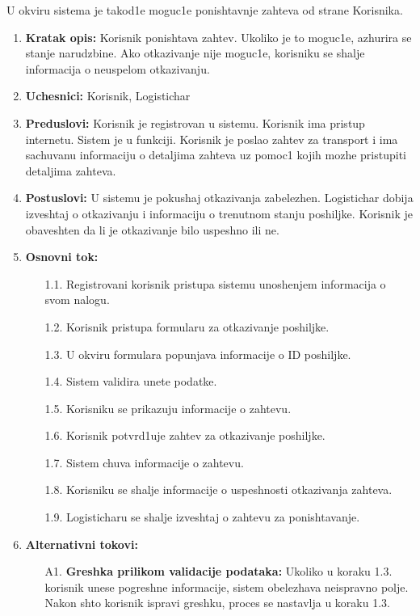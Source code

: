 
U okviru sistema je takod1e moguc1e ponishtavnje zahteva od strane Korisnika.


\begin{enumerate}
    \item \textbf{Kratak opis:} Korisnik ponishtava zahtev. Ukoliko je to moguc1e, azhurira se stanje narudzbine. Ako otkazivanje nije moguc1e, korisniku se shalje informacija o neuspelom otkazivanju.
    
    \item \textbf{Uchesnici:} Korisnik, Logistichar
    \item \textbf{Preduslovi:} Korisnik je registrovan u sistemu. Korisnik ima pristup internetu. Sistem je u funkciji. Korisnik je poslao zahtev za transport i ima sachuvanu informaciju o detaljima zahteva uz pomoc1 kojih mozhe pristupiti detaljima zahteva.
    
    \item \textbf{Postuslovi:} U sistemu je pokushaj otkazivanja zabelezhen. Logistichar dobija izveshtaj o otkazivanju i informaciju o trenutnom stanju poshiljke. Korisnik je obaveshten da li je otkazivanje bilo uspeshno ili ne. 
    \item \textbf{Osnovni tok:}
        \begin{enumerate}
            \item[1.1.] Registrovani korisnik pristupa sistemu unoshenjem informacija o svom nalogu.
            
            \item[1.2.] Korisnik pristupa formularu za otkazivanje poshiljke.
            \item[1.3.] U okviru formulara popunjava informacije o ID poshiljke.
            \item[1.4.] Sistem validira unete podatke.
            \item[1.5.] Korisniku se prikazuju informacije o zahtevu.
            \item[1.6.] Korisnik potvrd1uje zahtev za otkazivanje poshiljke. 
            \item[1.7.] Sistem chuva informacije o zahtevu.
            \item[1.8.] Korisniku se shalje informacije o uspeshnosti otkazivanja zahteva.
            \item[1.9.] Logisticharu se shalje izveshtaj o zahtevu za ponishtavanje.
            
        \end{enumerate}
    \item \textbf{Alternativni tokovi:}
            \begin{enumerate}
                \item [A1.] \textbf{Greshka prilikom validacije podataka: }
                Ukoliko u koraku 1.3. korisnik unese pogreshne informacije, sistem obelezhava neispravno polje. 
                Nakon shto korisnik ispravi greshku, proces se nastavlja u koraku 1.3.
                

\end{enumerate}
\end{enumerate}
